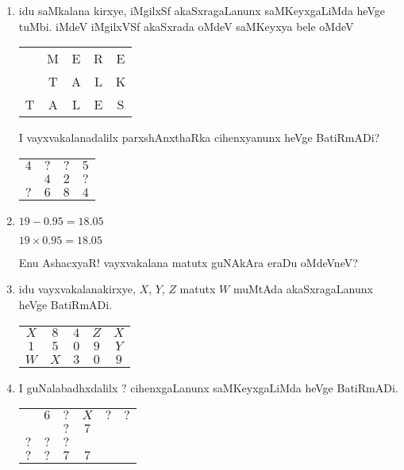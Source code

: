 \begin{enumerate}
\item idu saMkalana kirxye, iMgilxSf akaSxragaLanunx saMKeyxgaLiMda heVge tuMbi. iMdeV iMgilxVSf akaSxrada oMdeV saMKeyxya bele oMdeV
\begin{center}
\begin{tabular}{ccccc}
 & {\rm M} & {\rm E} & {\rm R} & {\rm E}\\
 & {\rm T} & {\rm A} & {\rm L} & {\rm K}\\
\hline
{\rm T} & {\rm A} & {\rm L} & {\rm E} & {\rm S}
\end{tabular}
\end{center}

I vayxvakalanadalilx parxshAnxthaRka cihenxyanunx heVge BatiRmADi?
\begin{center}
\begin{tabular}{cccc}
$4$ & $?$ & $?$ & $5$\\
& $4$ & $2$ & $?$\\
\hline
$?$ & $6$ & $8$ & $4$
\end{tabular}
\end{center}

\item $19-0.95=18.05$

$19\times 0.95=18.05$

Enu AshacxyaR! vayxvakalana matutx guNAkAra eraDu oMdeVneV?

\item idu vayxvakalanakirxye, $X$, $Y$, $Z$ matutx $W$ muMtAda akaSxragaLanunx heVge BatiRmADi.
\begin{center}
\begin{tabular}{ccccc}
$X$ & $8$ & $4$ & $Z$ & $X$\\
$1$ & $5$ & $0$ & $9$ & $Y$\\
\hline
$W$ & $X$ & $3$ & $0$ & $9$
\end{tabular}
\end{center}

\item I guNalabadhxdalilx $?$ cihenxgaLanunx saMKeyxgaLiMda heVge BatiRmADi.
\begin{center}
\begin{tabular}{cccccc}
 & $6$ & $?$ & $X$ & $?$ & $?$\\
\cline{2-6}
& & $?$ & $7$ & & \\
$?$ & $?$ & $?$ &  & \\
\hline
$?$ & $?$ & $7$ & $7$ &&
\end{tabular}
\end{center}


\end{enumerate}
